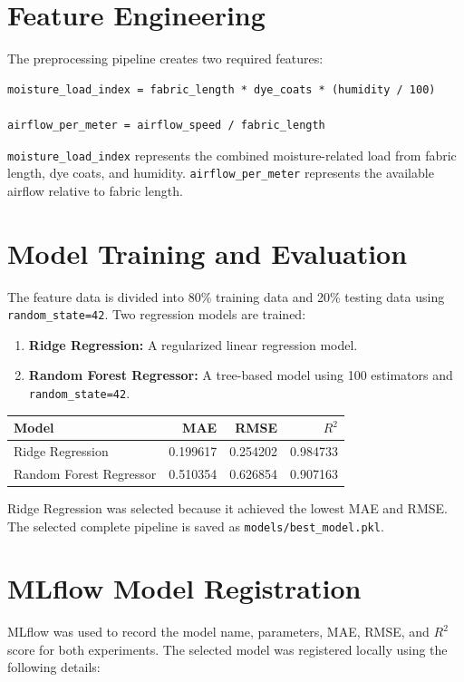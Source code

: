 \documentclass[12pt,a4paper]{article}
\begin{document}
\section{Feature Engineering}
The preprocessing pipeline creates two required features:

\begin{lstlisting}
moisture_load_index = fabric_length * dye_coats * (humidity / 100)

airflow_per_meter = airflow_speed / fabric_length
\end{lstlisting}

\texttt{moisture\_load\_index} represents the combined moisture-related load from fabric length, dye coats, and humidity. \texttt{airflow\_per\_meter} represents the available airflow relative to fabric length.

\section{Model Training and Evaluation}
The feature data is divided into 80\% training data and 20\% testing data using \texttt{random\_state=42}. Two regression models are trained:

\begin{enumerate}[leftmargin=*]
    \item \textbf{Ridge Regression:} A regularized linear regression model.
    \item \textbf{Random Forest Regressor:} A tree-based model using 100 estimators and \texttt{random\_state=42}.
\end{enumerate}

\begin{longtable}{lrrr}
\toprule
\textbf{Model} & \textbf{MAE} & \textbf{RMSE} & \textbf{$R^2$} \\
\midrule
Ridge Regression & 0.199617 & 0.254202 & 0.984733 \\
Random Forest Regressor & 0.510354 & 0.626854 & 0.907163 \\
\bottomrule
\end{longtable}

Ridge Regression was selected because it achieved the lowest MAE and RMSE. The selected complete pipeline is saved as \texttt{models/best\_model.pkl}.

\section{MLflow Model Registration}
MLflow was used to record the model name, parameters, MAE, RMSE, and $R^2$ score for both experiments. The selected model was registered locally using the following details:
\end{document}
